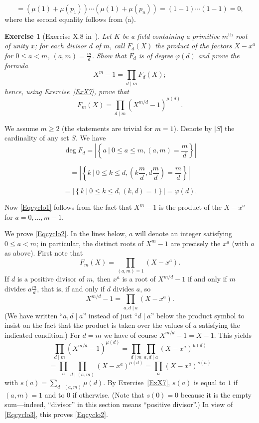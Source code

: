 \documentclass[12pt,letterpaper]{article}
\newtheorem{exer}[thm]{Exercise}
\theoremstyle{definition}
\begin{document}
$$
=(\mu(1)+\mu(p_1))\cdots(\mu(1)+\mu(p_n))=(1-1)\cdots(1-1)=0, 
$$ 
where the second equality follows from (a). 

\begin{exer}[Exercise X.8 in~\cite{weil1979}]\label{ExX8}
Let $K$ be a field containing a primitive $m^{\text{th}}$ root of unity $x$; for each divisor $d$ of $m$, call $F_d(X)$ the product of the factors $X-x^a$ for $0\le a<m$, $(a,m)=\frac{m}{d}$. Show that $F_d$ is of degree $\varphi(d)$ and prove the formula
\begin{equation}\label{Eqcyclo1} 
X^m-1=\prod_{d\mid m}F_d(X);
\end{equation} 
hence, using Exercise~\ref{ExX7}, prove that 
\begin{equation}\label{Eqcyclo2}
F_m(X)=\prod_{d\mid m}(X^{m/d}-1)^{\mu(d)}.
\end{equation} 
\end{exer}

We assume $m\ge2$ (the statements are trivial for $m=1$). Denote by $|S|$ the cardinality of any set $S$. We have 
$$
\deg F_d = \left|\left\{a\ \Big|\ 0\le a\le m, (a,m)=\frac{m}{d}\right\}\right|
$$ 

$$
= \left|\left\{k\ \Big|\ 0\le k\le d, \left(k\frac{m}{d},d\frac{m}{d}\right)=\frac{m}{d}\right\}\right|
$$ 

$$
= \left|\left\{k\ \Big|\ 0\le k\le d, (k,d)=1\right\}\right| = \varphi(d).
$$ 

Now \eqref{Eqcyclo1} follows from the fact that $X^m-1$ is the product of the $X-x^a$ for $a=0,\ldots,m-1$. 

We prove \eqref{Eqcyclo2}. In the lines below, $a$ will denote an integer satisfying $0\le a<m$; in particular, the distinct roots of $X^m-1$ are precisely the $x^a$ (with $a$ as above). First note that 
\begin{equation}\label{Eqcyclo3}
F_m(X)=\prod_{(a,m)=1}(X-x^a). 
\end{equation} 
If $d$ is a positive divisor of $m$, then $x^a$ is a root of $X^{m/d}-1$ if and only if $m$ divides $a\frac{m}{d}$, that is, if and only if $d$ divides $a$, so 
$$
X^{m/d}-1 = \prod_{a,d\mid a}(X-x^a).
$$ 
(We have written ``$a,d\mid a$'' instead of just ``$d\mid a$'' below the product symbol to insist on the fact that the product is taken over the values of $a$ satisfying the indicated condition.) For $d=m$ we have of course $X^{m/d}-1=X-1$. This yields 
$$
\prod_{d\mid m} (X^{m/d}-1)^{\mu(d)} = \prod_{d\mid m} \prod_{a, d\mid a} (X-x^a)^{\mu(d)} 
$$
$$
= 
\prod_a\prod_{d\mid(a,m)} (X-x^a)^{\mu(d)} = \prod_a (X-x^a)^{s(a)}
$$ 
with $s(a)=\sum_{d\mid(a,m)}\mu(d)$. By Exercise~\ref{ExX7}, $s(a)$ is equal to $1$ if $(a,m)=1$ and to $0$ if otherwise. (Note that $s(0)=0$ because it is the empty sum---indeed, ``divisor'' in this section means ``positive divisor''.) In view of \eqref{Eqcyclo3}, this proves \eqref{Eqcyclo2}. 
\end{document}
